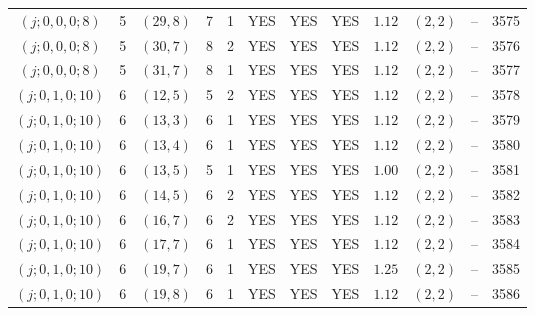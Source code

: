 \begin{longtable}{|c|c|c|c|c|c|c|c|c|c|c|c|}
$(j;0,0,0;8)$ & 5 & $(29,8)$ & 7 & 1 & YES & YES & YES & $1.12$ & $(2,2)$ & -- & 3575\\
$(j;0,0,0;8)$ & 5 & $(30,7)$ & 8 & 2 & YES & YES & YES & $1.12$ & $(2,2)$ & -- & 3576\\
$(j;0,0,0;8)$ & 5 & $(31,7)$ & 8 & 1 & YES & YES & YES & $1.12$ & $(2,2)$ & -- & 3577\\
$(j;0,1,0;10)$ & 6 & $(12,5)$ & 5 & 2 & YES & YES & YES & $1.12$ & $(2,2)$ & -- & 3578\\
$(j;0,1,0;10)$ & 6 & $(13,3)$ & 6 & 1 & YES & YES & YES & $1.12$ & $(2,2)$ & -- & 3579\\
$(j;0,1,0;10)$ & 6 & $(13,4)$ & 6 & 1 & YES & YES & YES & $1.12$ & $(2,2)$ & -- & 3580\\
$(j;0,1,0;10)$ & 6 & $(13,5)$ & 5 & 1 & YES & YES & YES & $1.00$ & $(2,2)$ & -- & 3581\\
$(j;0,1,0;10)$ & 6 & $(14,5)$ & 6 & 2 & YES & YES & YES & $1.12$ & $(2,2)$ & -- & 3582\\
$(j;0,1,0;10)$ & 6 & $(16,7)$ & 6 & 2 & YES & YES & YES & $1.12$ & $(2,2)$ & -- & 3583\\
$(j;0,1,0;10)$ & 6 & $(17,7)$ & 6 & 1 & YES & YES & YES & $1.12$ & $(2,2)$ & -- & 3584\\
$(j;0,1,0;10)$ & 6 & $(19,7)$ & 6 & 1 & YES & YES & YES & $1.25$ & $(2,2)$ & -- & 3585\\
$(j;0,1,0;10)$ & 6 & $(19,8)$ & 6 & 1 & YES & YES & YES & $1.12$ & $(2,2)$ & -- & 3586
\end{longtable}

